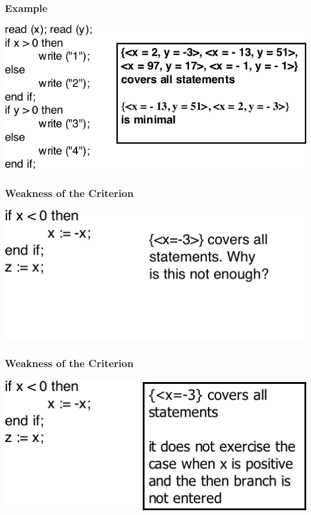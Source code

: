\documentclass[t,12pt,numbers,fleqn]{beamer}
\begin{document}

\begin{frame}
\frametitle{Example}

\includegraphics[scale=0.5]{../Figures/ExampleStatementCoverage.png}

\end{frame}


\begin{frame}
\frametitle{Weakness of the Criterion}

\includegraphics[scale=0.6]{../Figures/WeaknessStatementCoverageOnlyCode.png}

\end{frame}


\begin{frame}
\frametitle{Weakness of the Criterion}

\includegraphics[scale=0.6]{../Figures/WeaknessStatementCoverage.png}

\end{frame}
\end{document}
